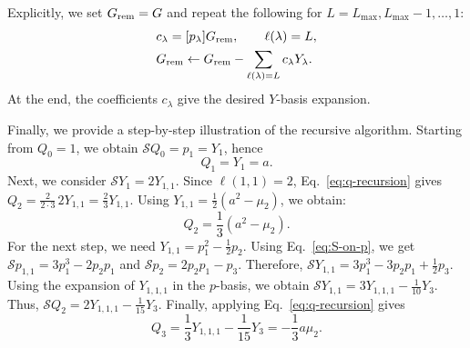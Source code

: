 \documentclass[9pt,twocolumn,twoside]{gsajnl}
\newcommand{\Sop}{\mathcal S}
\begin{document}
Explicitly, we set $G_{\rm rem}=G$ and repeat the following for $L=L_{\max},L_{\max}-1,\ldots,1$:
\begin{align}
&c_\lambda=[p_\lambda]G_{\rm rem},
\qquad \ell(\lambda)=L,
\label{eq:tri-c}\\
&G_{\rm rem} \leftarrow
G_{\rm rem} - \sum_{\ell(\lambda)=L}c_\lambda Y_\lambda. \nonumber
\end{align}
At the end, the coefficients $c_\lambda$ give the desired $Y$-basis expansion.


Finally, we provide a step-by-step illustration of the recursive algorithm.
Starting from $Q_0=1$, we obtain $\Sop Q_0=p_1=Y_{1}$, hence
\begin{equation}
Q_1=Y_{1}=a.
\label{eq:Q1-derive}
\end{equation}
Next, we consider
$\Sop Y_{1}=2Y_{1,1}$.
Since $\ell(1,1)=2$, Eq.~\eqref{eq:q-recursion} gives
$Q_2=\frac{2}{2\cdot 3}\,2Y_{1,1}=\frac23Y_{1,1}$.
Using $Y_{1,1}=\frac12(a^2-\mu_2)$, we obtain:
\begin{equation}
Q_2=\frac13(a^2-\mu_2).
\label{eq:Q2-amu}
\end{equation}
For the next step, we need
$Y_{1,1}=p_1^2-\frac12p_2$.
Using Eq.~\eqref{eq:S-on-p}, we get $\Sop p_{1,1} = 3p_1^3-2p_2p_1$ and $\Sop p_2 = 2p_2p_1-p_3$.
Therefore,
$\Sop Y_{1,1}=3p_1^3-3p_2p_1+\frac12p_3$.
Using the expansion of $Y_{1,1,1}$
in the $p$-basis,
we obtain
$\Sop Y_{1,1}=3Y_{1,1,1}-\frac1{10}Y_{3}$.
Thus,
$\Sop Q_2=2Y_{1,1,1}-\frac1{15}Y_{3}$.
Finally, applying Eq.~\eqref{eq:q-recursion} gives
\begin{equation}
Q_3=\frac13Y_{1,1,1}-\frac1{15}Y_{3} = -\frac13a\mu_2.
\label{eq:Q3-Y-derive}
\end{equation}
\end{document}
